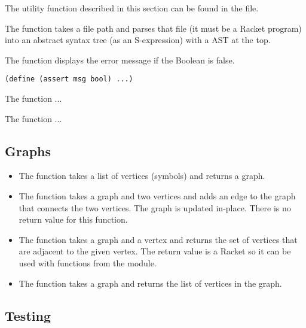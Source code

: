\documentclass[11pt]{book}
\begin{document}
The utility function described in this section can be found in the
 file.

The  function takes a file path and parses that file
(it must be a Racket program) into an abstract syntax tree (as an
S-expression) with a  AST at the top.

The  function displays the error message  if the
Boolean  is false.
\begin{lstlisting}
(define (assert msg bool) ...)
\end{lstlisting}

The  function ...

The  function ...


\subsection{Graphs}

\begin{itemize}
\item The  function takes a list of vertices
  (symbols) and returns a graph.

\item The  function takes a graph and two vertices and
  adds an edge to the graph that connects the two vertices. The graph
  is updated in-place. There is no return value for this function.

\item The  function takes a graph and a vertex and
  returns the set of vertices that are adjacent to the given
  vertex. The return value is a Racket  so it can be
  used with functions from the  module.

\item The  function takes a graph and returns the list
  of vertices in the graph.
\end{itemize}

\subsection{Testing}
\end{document}
